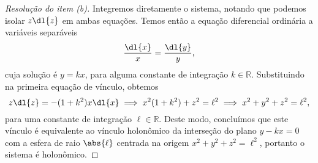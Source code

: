\begin{proof}[Resolução do item (b)]
    Integremos diretamente o sistema, notando que podemos isolar \(z \dl{z}\) em ambas equações. Temos então a equação diferencial ordinária a variáveis separáveis
    \begin{equation*}
        \frac{\dl{x}}{x} = \frac{\dl{y}}{y},
    \end{equation*}
    cuja solução é \(y = kx\), para alguma constante de integração \(k \in \mathbb{R}\). Substituindo na primeira equação de vínculo, obtemos
    \begin{equation*}
        z \dl{z} = - (1 + k^2)x \dl{x} \implies x^2(1 + k^2) +  z^2 = \ell^2 \implies x^2 + y^2 + z^2 = \ell^2,
    \end{equation*}
    para uma constante de integração \(\ell \in \mathbb{R}\). Deste modo, concluímos que este vínculo é equivalente ao vínculo holonômico da interseção do plano \(y - kx = 0\) com a esfera de raio \(\abs{\ell}\) centrada na origem \(x^2 + y^2 + z^2 = \ell^2\), portanto o sistema é holonômico.
\end{proof}
